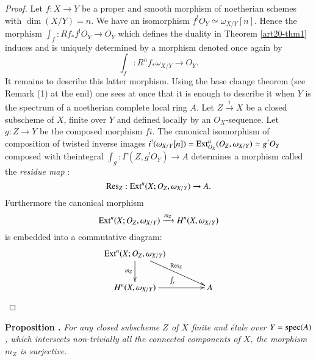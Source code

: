 \begin{proof}
Let $f:X\to Y$ be a proper and smooth morphism of noetherian schemes with $\dim(X/Y)=n$. We have an isomorphism $f^{!}O_{Y}\simeq \omega_{X/Y}[n]$. Hence the morphism $\int_{f}:Rf_{*}f^{!}O_{Y}\to O_{Y}$ which defines the duality in Theorem \ref{art20-thm1} induces and is uniquely determined by a morphism denoted once again by
$$
\int_{f}:R^{n}f_{*}\omega_{X/Y}\to O_{Y}.
$$
It remains to describe this latter morphism. Using the base change theorem (see Remark (1) at the end) one sees at once that it is enough to describe it when $Y$ is the spectrum of a noetherian complete local ring $A$. Let $Z\xrightarrow{i}X$ be a closed subscheme of $X$, finite over $Y$ and defined locally by an $O_{X}$-sequence. Let $g:Z\to Y$ be the composed morphism $fi$. The canonical isomorphism of composition of twisted inverse images $i^{!}(\omega_{X/Y}[n])=\operatorname{\mathrm{Ext}}_{O_{X}}^{n}(O_{Z},\omega_{X/Y})\simeq g^{!}O_{Y}$ composed with the\pageoriginale integral $\int_{g}:\Gamma(Z,g^{!}O_{Y})\to A$ determines a morphism called the {\em residue map} :
$$
\operatorname{\mathrm{Res}}_{Z}:\operatorname{\mathrm{Ext}}^{n}(X;O_{Z},\omega_{X/Y})\to A.
$$
Furthermore the canonical morphism
$$
\operatorname{\mathrm{Ext}}^{n}(X;O_{Z},\omega_{X/Y})\xrightarrow{m_{Z}}H^{n}(X,\omega_{X/Y})
$$
is embedded into a commutative diagram:
\[
\xymatrix@C=1.5cm{
\Ext^{n}(X;O_{Z},\omega_{X/Y})\ar[d]_-{m_{Z}}\ar[dr]^{\Res_{Z}} & \\
H^{n}(X,\omega_{X/Y})\ar[r]^{\int_{f}} & A
}
\]
\end{proof}

\medskip
\noindent
{\bf Proposition .\label{art20-prop2}}
{\em For any closed subscheme $Z$ of $X$ finite and \'etale over $Y=\operatorname{\mathrm{spec}} (A)$, which intersects non-trivially all the connected components of $X$, the morphism $m_{Z}$ is surjective.}
\smallskip


